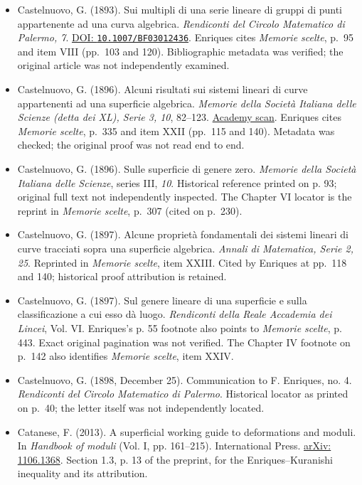 \begin{sloppypar}
\begin{itemize}
\item Castelnuovo, G. (1893). Sui multipli di una serie lineare di gruppi di punti appartenente ad una curva algebrica. \emph{Rendiconti del Circolo Matematico di Palermo, 7}. \href{https://doi.org/10.1007/BF03012436}{DOI: \nolinkurl{10.1007/BF03012436}}. Enriques cites \emph{Memorie scelte}, p.~95 and item VIII (pp.~103 and 120). Bibliographic metadata was verified; the original article was not independently examined.

\item Castelnuovo, G. (1896). Alcuni risultati sui sistemi lineari di curve appartenenti ad una superficie algebrica. \emph{Memorie della Società Italiana delle Scienze (detta dei XL), Serie 3, 10}, 82--123. \href{https://media.accademiaxl.it/memorie/S3-VX-1896/Castelnuovo82-123.pdf}{Academy scan}. Enriques cites \emph{Memorie scelte}, p.~335 and item XXII (pp.~115 and 140). Metadata was checked; the original proof was not read end to end.

\item Castelnuovo, G. (1896). Sulle superficie di genere zero. \emph{Memorie della Societ\`a Italiana delle Scienze}, series III, \emph{10}. Historical reference printed on p. 93; original full text not independently inspected. The Chapter VI locator is the reprint in \emph{Memorie scelte}, p.~307 (cited on p.~230).

\item Castelnuovo, G. (1897). Alcune proprietà fondamentali dei sistemi lineari di curve tracciati sopra una superficie algebrica. \emph{Annali di Matematica, Serie 2, 25}. Reprinted in \emph{Memorie scelte}, item XXIII. Cited by Enriques at pp.~118 and 140; historical proof attribution is retained.

\item Castelnuovo, G. (1897). Sul genere lineare di una superficie e sulla classificazione a cui esso d\`a luogo. \emph{Rendiconti della Reale Accademia dei Lincei}, Vol. VI. Enriques's p. 55 footnote also points to \emph{Memorie scelte}, p. 443. Exact original pagination was not verified. The Chapter IV footnote on p.~142 also identifies \emph{Memorie scelte}, item XXIV.

\item Castelnuovo, G. (1898, December 25). Communication to F. Enriques, no. 4. \emph{Rendiconti del Circolo Matematico di Palermo}. Historical locator as printed on p.~40; the letter itself was not independently located.

\item Catanese, F. (2013). A superficial working guide to deformations and moduli. In \emph{Handbook of moduli} (Vol. I, pp. 161--215). International Press. \href{https://arxiv.org/abs/1106.1368}{arXiv: 1106.1368}. Section 1.3, p. 13 of the preprint, for the Enriques--Kuranishi inequality and its attribution.


\end{itemize}
\end{sloppypar}
